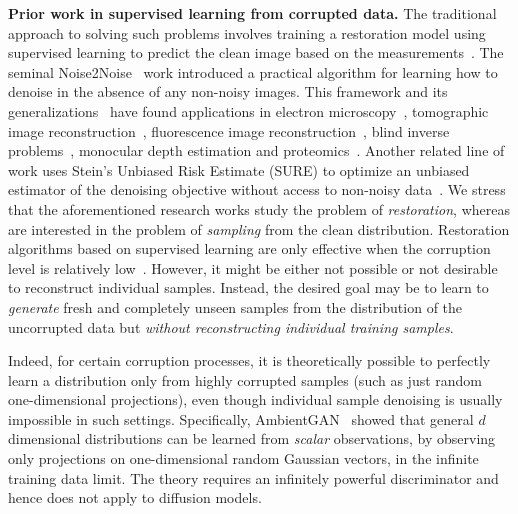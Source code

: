 \documentclass{article}
\begin{document}
\textbf{Prior work in supervised learning from corrupted data.} The traditional approach to solving such problems involves training a restoration model using supervised learning to predict the clean image based on the measurements~\citep{pathak2016context, richardson2020encoding, Yu_2019, Liu_2019}. The seminal Noise2Noise~\citep{noise2noise} work introduced a practical algorithm for learning how to denoise in the absence of any non-noisy images. This framework and its generalizations~\citep{batson2019noise2self, krull2019noise2void, tachella2022unsupervised} have found applications in electron microscopy~\citep{electron_microscopy}, tomographic image reconstruction~\citep{wang2020deep}, fluorescence image reconstruction~\citep{zhang2019poisson}, blind inverse problems~\citep{guo2019toward, batson2019noise2self}, monocular depth estimation and proteomics~\citep{bauerlein2021towards}. Another related line of work uses Stein's Unbiased Risk Estimate (SURE) to optimize an unbiased estimator of the denoising objective without access to non-noisy data~\citep{SURE}.
We stress that the aforementioned research works study the problem of \textit{restoration}, whereas are interested in the problem of \textit{sampling} from the clean distribution. Restoration algorithms based on supervised learning are only effective when the corruption level is relatively low~\citep{delbracio2023inversion}.
However, it might be either not possible or not desirable to reconstruct individual samples. 
Instead, the desired goal may be to learn to \textit{generate} fresh and completely unseen samples from the distribution of the uncorrupted data but \textit{without reconstructing individual training samples}. 

Indeed, for certain corruption processes, it is theoretically possible to perfectly learn a distribution only from highly corrupted samples (such as just random one-dimensional projections), even though individual sample denoising is usually impossible in such settings.
Specifically, AmbientGAN~\citep{bora2018ambientgan} showed that general $d$ dimensional distributions can be learned from \textit{scalar} observations, by observing only projections on one-dimensional random  Gaussian vectors, in the infinite training data  limit. The theory requires an infinitely powerful discriminator and hence does not apply to diffusion models.
\end{document}
